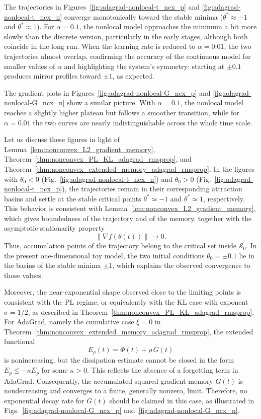 \documentclass{article} %
\begin{document}
The trajectories in Figures~\ref{fig:adagrad-nonlocal-t_ncx_p} and \ref{fig:adagrad-nonlocal-t_ncx_n} converge monotonically toward the stable minima (\(\theta^*\approx -1\) and \(\theta^*\approx 1\)). For \(\alpha=0.1\), the nonlocal model approaches the minimum a bit more slowly than the discrete version, particularly in the early stages, although both coincide in the long run. When the learning rate is reduced to \(\alpha=0.01\), the two trajectories almost overlap, confirming the accuracy of the continuous model for smaller values of \(\alpha\) and highlighting the system’s symmetry: starting at \(\pm 0.1\) produces mirror profiles toward \(\pm 1\), as expected.

The gradient plots in Figures~\ref{fig:adagrad-nonlocal-G_ncx_p} and \ref{fig:adagrad-nonlocal-G_ncx_n} show a similar picture. With \(\alpha=0.1\), the nonlocal model reaches a slightly higher plateau but follows a smoother transition, while for \(\alpha=0.01\) the two curves are nearly indistinguishable across the whole time scale. 

Let us discuss these figures in light of Lemma~\ref{lem:nonconvex_L2_gradient_memory}, Theorem~\ref{thm:nonconvex_PL_KL_adagrad_rmsprop}, and Theorem~\ref{thm:nonconvex_extended_memory_adagrad_rmsprop}. In the figures with $\theta_0<0$ (Fig.~\ref{fig:adagrad-nonlocal-t_ncx_n}) and $\theta_0>0$ (Fig.~\ref{fig:adagrad-nonlocal-t_ncx_p}), the trajectories remain in their corresponding attraction basins and settle at the stable critical points $\theta^*\simeq -1$ and $\theta^*\simeq 1$, respectively. This behavior  is consistent with Lemma~\ref{lem:nonconvex_L2_gradient_memory}, which gives boundedness of the trajectory and of the memory, together with the asymptotic stationarity property
\[
    \|\nabla f(\theta(t))\|\to 0.
\]
Thus, accumulation points of the trajectory belong to the critical set inside $\mathcal S_0$. In the present one-dimensional toy model, the two initial conditions $\theta_0=\pm0.1$ lie in the basins of the stable minima $\pm1$, which explains the observed convergence to those values.

Moreover, the near-exponential shape observed close to the limiting points is consistent with the PL regime, or equivalently with the KL case with exponent $\sigma=1/2$, as described in Theorem~\ref{thm:nonconvex_PL_KL_adagrad_rmsprop}. For AdaGrad, namely the cumulative case $\xi=0$ in Theorem~\ref{thm:nonconvex_extended_memory_adagrad_rmsprop}, the extended functional
\[
    E_\rho(t)=\Phi(t)+\rho\,G(t)
\]
is nonincreasing, but the dissipation estimate cannot be closed in the form $\dot E_\rho\leq -\kappa E_\rho$ for some $\kappa>0$. This reflects the absence of a forgetting term in AdaGrad. Consequently, the accumulated squared-gradient memory $G(t)$ is nondecreasing and converges to a finite, generally nonzero, limit. Therefore, no exponential decay rate for $G(t)$ should be claimed in this case, as illustrated in Figs.~\ref{fig:adagrad-nonlocal-G_ncx_p} and~\ref{fig:adagrad-nonlocal-G_ncx_n}.
\end{document}
